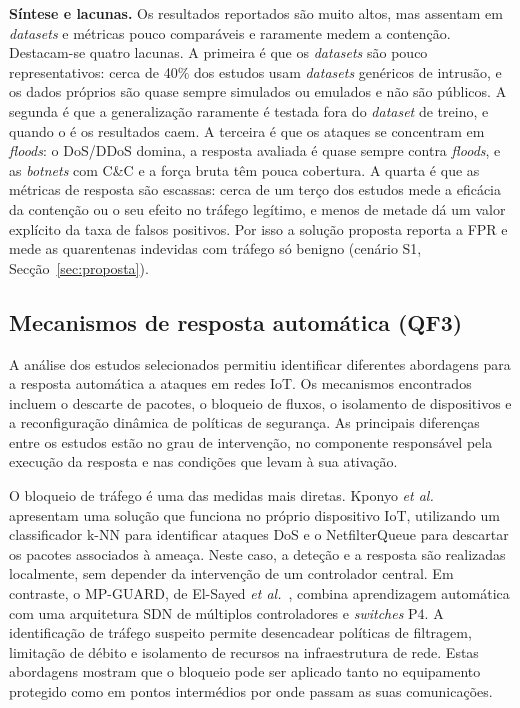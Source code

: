 \documentclass[conference,a4paper]{IEEEtran}
\begin{document}
\textbf{Síntese e lacunas.} Os resultados reportados são muito altos, mas assentam em
\textit{datasets} e métricas pouco comparáveis e raramente medem a contenção. Destacam-se
quatro lacunas. A primeira é que os \textit{datasets} são pouco representativos: cerca de
40\% dos estudos usam \textit{datasets} genéricos de intrusão, e os dados próprios são
quase sempre simulados ou emulados e não são públicos. A segunda é que a generalização
raramente é testada fora do \textit{dataset} de treino, e quando o é os resultados caem.
A terceira é que os ataques se concentram em \textit{floods}: o DoS/DDoS domina, a
resposta avaliada é quase sempre contra \textit{floods}, e as \textit{botnets} com C\&C e
a força bruta têm pouca cobertura. A quarta é que as métricas de resposta são escassas:
cerca de um terço dos estudos mede a eficácia da contenção ou o seu efeito no tráfego
legítimo, e menos de metade dá um valor explícito da taxa de falsos positivos. Por isso a
solução proposta reporta a FPR e mede as quarentenas indevidas com tráfego só benigno
(cenário S1, Secção~\ref{sec:proposta}).

\subsection{Mecanismos de resposta automática (QF3)}
A análise dos estudos selecionados permitiu identificar diferentes abordagens para a resposta automática a ataques em redes IoT. Os mecanismos encontrados incluem o descarte de pacotes, o bloqueio de fluxos, o isolamento de dispositivos e a reconfiguração dinâmica de políticas de segurança. As principais diferenças entre os estudos estão no grau de intervenção, no componente responsável pela execução da resposta e nas condições que levam à sua ativação.

O bloqueio de tráfego é uma das medidas mais diretas. Kponyo \textit{et al.}~\cite{kponyo2020lightweight} apresentam uma solução que funciona no próprio dispositivo IoT, utilizando um classificador k-NN para identificar ataques DoS e o NetfilterQueue para descartar os pacotes associados à ameaça. Neste caso, a deteção e a resposta são realizadas localmente, sem depender da intervenção de um controlador central. Em contraste, o MP-GUARD, de El-Sayed \textit{et al.}~\cite{elsayed2024mpguard}, combina aprendizagem automática com uma arquitetura SDN de múltiplos controladores e \textit{switches} P4. A identificação de tráfego suspeito permite desencadear políticas de filtragem, limitação de débito e isolamento de recursos na infraestrutura de rede. Estas abordagens mostram que o bloqueio pode ser aplicado tanto no equipamento protegido como em pontos intermédios por onde passam as suas comunicações.
\end{document}
